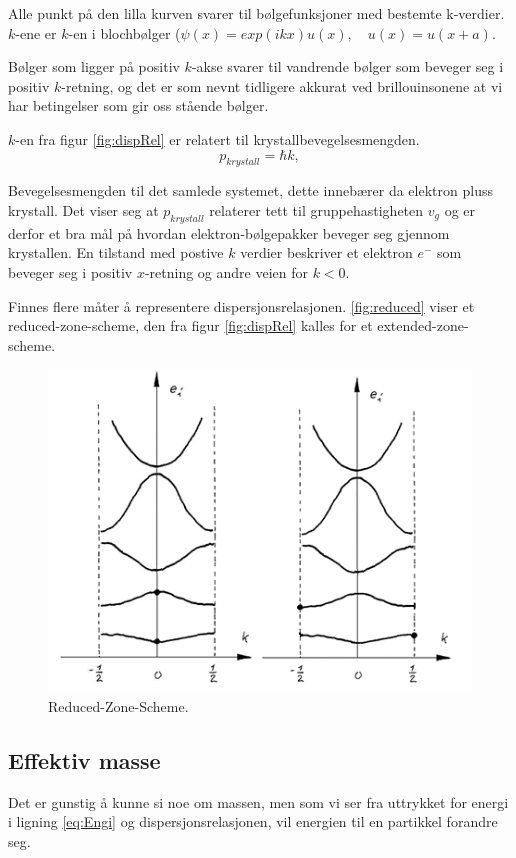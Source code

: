 Alle punkt på den lilla kurven svarer til bølgefunksjoner med bestemte k-verdier. $k$-ene er $k$-en i blochbølger ($\psi(x)=exp(ikx)u(x), \quad u(x)=u(x+a)$.

Bølger som ligger på positiv $k$-akse svarer til vandrende bølger som beveger seg i positiv $k$-retning, og det er som nevnt tidligere akkurat ved brillouinsonene at vi har betingelser som gir oss stående bølger.

$k$-en fra figur \ref{fig:dispRel} er relatert til krystallbevegelsesmengden.
\begin{equation*}
    p_{krystall} = \hbar k,
\end{equation*}

Bevegelsesmengden til det samlede systemet, dette innebærer da elektron pluss krystall. Det viser seg at $p_{krystall}$ relaterer tett til gruppehastigheten $v_g$ og er derfor et bra mål på hvordan elektron-bølgepakker beveger seg gjennom krystallen. En tilstand med postive $k$ verdier beskriver et elektron $e^-$ som beveger seg i positiv $x$-retning og andre veien for $k<0$.

Finnes flere måter å representere dispersjonsrelasjonen. \autoref{fig:reduced} viser et reduced-zone-scheme, den fra figur \ref{fig:dispRel} kalles for et extended-zone-scheme.

\begin{figure}[!htb]
    \centering
    \includegraphics[scale=0.6]{Bilder/SamtaleTema5/Reduced-zone-scheme.png}
    \caption{Reduced-Zone-Scheme.}
    \label{fig:reduced}
\end{figure}

\subsection{Effektiv masse}
\label{sec:tema5_6}
Det er gunstig å kunne si noe om massen, men som vi ser fra uttrykket for energi i ligning \ref{eq:Engi} og dispersjonsrelasjonen, vil energien til en partikkel forandre seg.

